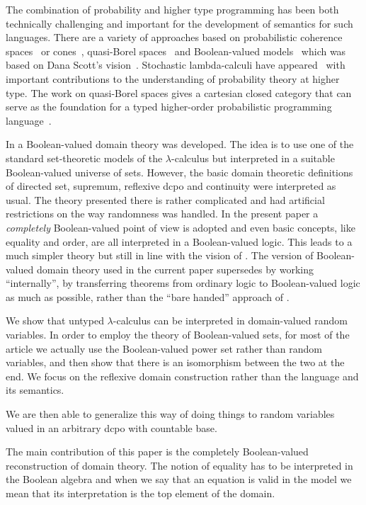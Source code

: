 \documentclass{lmcs}
\begin{document}
The combination of probability and higher type programming has been both
technically challenging and important for the development of semantics for such
languages.  There are a variety of approaches based on probabilistic coherence
spaces~\cite{Ehrhard14} or cones~\cite{Ehrhard17}, quasi-Borel
spaces~\cite{Staton16,Heunen17,Vakar19} and Boolean-valued
models~\cite{Bacci18b} which was based on Dana Scott's vision~\cite{Scott14}.
Stochastic lambda-calculi have appeared~\cite{Borgstrom16,Dahlqvist20,Amorim21}
with important contributions to the understanding of probability theory at
higher type.  The work on quasi-Borel spaces gives a cartesian closed category
that can serve as the foundation for a typed higher-order probabilistic
programming language~\cite{Heunen17}.  

In \cite{Bacci18b} a Boolean-valued domain theory was
developed.  The idea is to use one of the standard set-theoretic models of the
$\lambda$-calculus but interpreted in a suitable Boolean-valued universe of
sets.  However, the basic domain theoretic definitions of directed set,
supremum, reflexive dcpo and continuity were interpreted as usual.  The theory
presented there is rather complicated and had artificial restrictions on the way
randomness was handled.  In the present paper a \emph{completely} Boolean-valued
point of view is adopted and even basic concepts, like equality and order, are
all interpreted in a Boolean-valued logic.  This leads to a much simpler theory
but still in line with the vision of \cite{Scott14}. The version of Boolean-valued domain theory used in the current paper supersedes \cite{Bacci18b} by working ``internally'', by transferring theorems from ordinary logic to Boolean-valued logic as much as possible, rather than the ``bare handed'' approach of \cite{Bacci18b}. 

We show that untyped $\lambda$-calculus can be interpreted in domain-valued
random variables. In order to employ the theory of Boolean-valued sets, for most
of the article we actually use the Boolean-valued power set rather than random
variables, and then show that there is an isomorphism between the two at the
end.  We focus on the reflexive domain construction rather than the language and
its semantics. 

We are then able to generalize this way of doing things to random variables valued in an arbitrary dcpo with countable base.

The main contribution of this paper is the completely Boolean-valued reconstruction of domain
theory.  The
notion of equality has to be interpreted in the Boolean algebra and when we say
that an equation is valid in the model we mean that its interpretation is the
top element of the domain.
\end{document}
